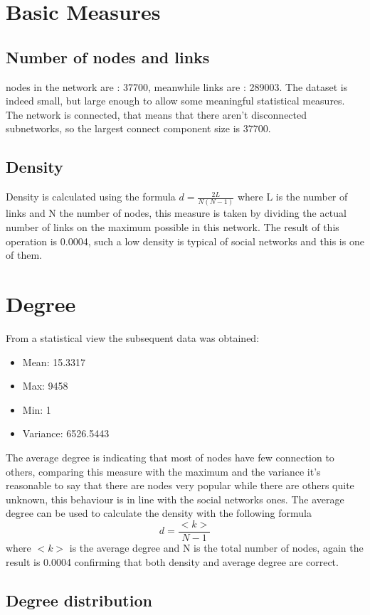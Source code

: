 \documentclass[]{article}
\begin{document}
    \section{Basic Measures}
    
    \subsection*{Number of nodes and links}
    nodes in the network are : 37700, meanwhile links are : 289003. The dataset is indeed small, but large enough to allow some meaningful statistical measures. The network is connected, that means that there aren't disconnected subnetworks, so the largest connect component size is 37700.
    
    \subsection*{Density}
    Density is calculated using the formula $d=\frac{2L}{N(N-1)}$ where L is the number of links and N the number of nodes, this measure is taken by dividing the actual number of links on the maximum possible in this network. The result of this operation is 0.0004, such a low density is typical of social networks and this is one of them.

    \section*{Degree}   
    From a statistical view the subsequent data was obtained:
    \begin{itemize}
        \item Mean: 15.3317
        \item Max: 9458
        \item Min: 1
        \item Variance: 6526.5443
    \end{itemize}
    The average degree is indicating that most of nodes have few connection to others, comparing this measure with the maximum and the variance it's reasonable to say that there are nodes very popular while there are others quite unknown, this behaviour is in line with the social networks ones. The average degree can be used to calculate the density with the following formula $$d=\frac{<k>}{N-1}$$ where $<k>$ is the average degree and N is the total number of nodes, again the result is 0.0004 confirming that both density and average degree are correct. 

    \subsection*{Degree distribution}
\end{document}
